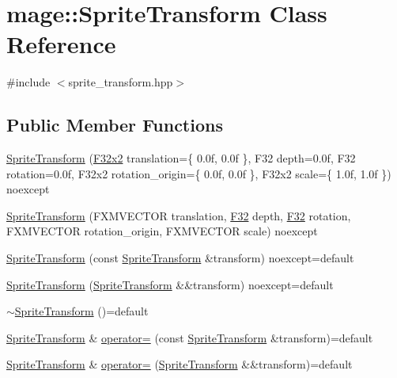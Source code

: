 \hypertarget{classmage_1_1_sprite_transform}{}\section{mage\+:\+:Sprite\+Transform Class Reference}
\label{classmage_1_1_sprite_transform}


{\ttfamily \#include $<$sprite\+\_\+transform.\+hpp$>$}

\subsection*{Public Member Functions}
\begin{DoxyCompactItemize}
\item 
\hyperlink{classmage_1_1_sprite_transform_a8d3760699d035e6315218bb6b589a2cb}{Sprite\+Transform} (\hyperlink{namespacemage_aa87237ad091f5cd7da612b8523fc108f}{F32x2} translation=\{ 0.\+0f, 0.\+0f \}, F32 depth=0.\+0f, F32 rotation=0.\+0f, F32x2 rotation\+\_\+origin=\{ 0.\+0f, 0.\+0f \}, F32x2 scale=\{ 1.\+0f, 1.\+0f \}) noexcept
\item 
\hyperlink{classmage_1_1_sprite_transform_a72e3b546e705870fb6359770468e7faa}{Sprite\+Transform} (F\+X\+M\+V\+E\+C\+T\+OR translation, \hyperlink{namespacemage_aa97e833b45f06d60a0a9c4fc22ae02c0}{F32} depth, \hyperlink{namespacemage_aa97e833b45f06d60a0a9c4fc22ae02c0}{F32} rotation, F\+X\+M\+V\+E\+C\+T\+OR rotation\+\_\+origin, F\+X\+M\+V\+E\+C\+T\+OR scale) noexcept
\item 
\hyperlink{classmage_1_1_sprite_transform_acbb83bc167067a81a5d0b6255e886133}{Sprite\+Transform} (const \hyperlink{classmage_1_1_sprite_transform}{Sprite\+Transform} \&transform) noexcept=default
\item 
\hyperlink{classmage_1_1_sprite_transform_a320698bf4095c5886256bd17e32a6e3f}{Sprite\+Transform} (\hyperlink{classmage_1_1_sprite_transform}{Sprite\+Transform} \&\&transform) noexcept=default
\item 
\hyperlink{classmage_1_1_sprite_transform_a14a3614023996cbb071c3de99f9528bc}{$\sim$\+Sprite\+Transform} ()=default
\item 
\hyperlink{classmage_1_1_sprite_transform}{Sprite\+Transform} \& \hyperlink{classmage_1_1_sprite_transform_af0adccff92d48e7b347e66277981ee07}{operator=} (const \hyperlink{classmage_1_1_sprite_transform}{Sprite\+Transform} \&transform)=default
\item 
\hyperlink{classmage_1_1_sprite_transform}{Sprite\+Transform} \& \hyperlink{classmage_1_1_sprite_transform_a9278d3fd0a6d346b188515b67a1adfc2}{operator=} (\hyperlink{classmage_1_1_sprite_transform}{Sprite\+Transform} \&\&transform)=default

\end{DoxyCompactItemize}
